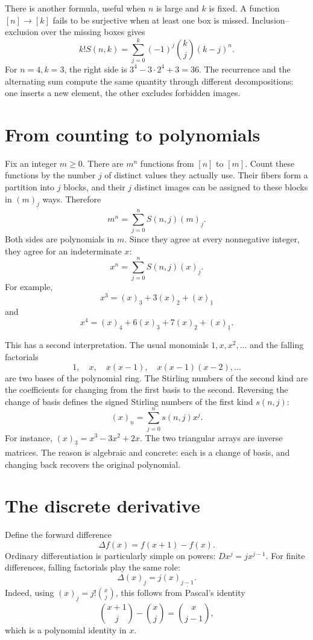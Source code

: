 There is another formula, useful when \(n\) is large and \(k\) is fixed. A function \([n]\to[k]\) fails to be surjective when at least one box is missed. Inclusion--exclusion over the missing boxes gives
\[
 \boxed{k!S(n,k)=\sum_{j=0}^k(-1)^j\binom{k}{j}(k-j)^n.}
\]
For \(n=4,k=3\), the right side is \(3^4-3\cdot2^4+3=36\). The recurrence and the alternating sum compute the same quantity through different decompositions: one inserts a new element, the other excludes forbidden images.

\section{From counting to polynomials}

Fix an integer \(m\ge0\). There are \(m^n\) functions from \([n]\) to \([m]\). Count these functions by the number \(j\) of distinct values they actually use. Their fibers form a partition into \(j\) blocks, and their \(j\) distinct images can be assigned to these blocks in \((m)_{\underline j}\) ways. Therefore
\[
 m^n=\sum_{j=0}^nS(n,j)(m)_{\underline j}.
\]
Both sides are polynomials in \(m\). Since they agree at every nonnegative integer, they agree for an indeterminate \(x\):
\[
 \boxed{x^n=\sum_{j=0}^nS(n,j)(x)_{\underline j}.}
\]
For example,
\[
 x^3=(x)_{\underline3}+3(x)_{\underline2}+(x)_{\underline1}
\]
and
\[
 x^4=(x)_{\underline4}+6(x)_{\underline3}
             +7(x)_{\underline2}+(x)_{\underline1}.
\]

This has a second interpretation. The usual monomials \(1,x,x^2,\ldots\) and the falling factorials
\[
 1,\quad x,\quad x(x-1),\quad x(x-1)(x-2),\ldots
\]
are two bases of the polynomial ring. The Stirling numbers of the second kind are the coefficients for changing from the first basis to the second. Reversing the change of basis defines the signed Stirling numbers of the first kind \(s(n,j)\):
\[
 (x)_{\underline n}=\sum_{j=0}^ns(n,j)x^j.
\]
For instance, \((x)_{\underline3}=x^3-3x^2+2x\). The two triangular arrays are inverse matrices. The reason is algebraic and concrete: each is a change of basis, and changing back recovers the original polynomial.

\section{The discrete derivative}

Define the forward difference
\[
 \Delta f(x)=f(x+1)-f(x).
\]
Ordinary differentiation is particularly simple on powers:
\(Dx^j=jx^{j-1}\). For finite differences, falling factorials play the same role:
\[
 \boxed{\Delta (x)_{\underline j}=j(x)_{\underline{j-1}}.}
\]
Indeed, using \((x)_{\underline j}=j!\binom{x}{j}\), this follows from Pascal's identity
\[
 \binom{x+1}{j}-\binom{x}{j}=\binom{x}{j-1},
\]
which is a polynomial identity in \(x\).

